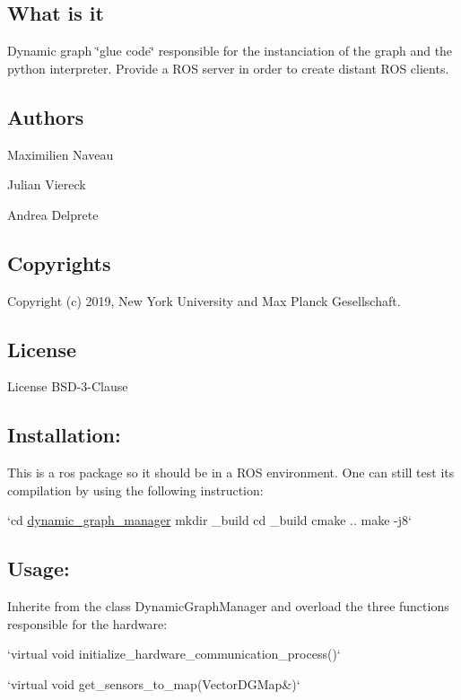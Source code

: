 \subsection*{What is it}

Dynamic graph \char`\"{}glue code\char`\"{} responsible for the instanciation of the graph and the python interpreter. Provide a R\+OS server in order to create distant R\+OS clients.

\subsection*{Authors}


\begin{DoxyItemize}
\item Maximilien Naveau
\item Julian Viereck
\item Andrea Delprete
\end{DoxyItemize}

\subsection*{Copyrights}

Copyright (c) 2019, New York University and Max Planck Gesellschaft.

\subsection*{License}

License B\+S\+D-\/3-\/\+Clause

\subsection*{Installation\+:}

This is a ros package so it should be in a R\+OS environment. One can still test its compilation by using the following instruction\+:

`cd \hyperlink{namespacedynamic__graph__manager}{dynamic\+\_\+graph\+\_\+manager} mkdir \+\_\+build cd \+\_\+build cmake .. make -\/j8`

\subsection*{Usage\+:}

Inherite from the class Dynamic\+Graph\+Manager and overload the three functions responsible for the hardware\+: \begin{DoxyVerb} `virtual void initialize_hardware_communication_process()`

 `virtual void get_sensors_to_map(VectorDGMap&)`
\end{DoxyVerb}


